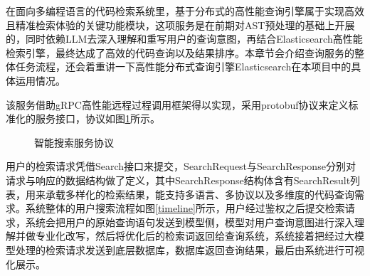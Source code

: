 \documentclass[UTF8,a4paper,12pt]{ctexart}
\numberwithin{equation}{section}
\begin{document}
在面向多编程语言的代码检索系统里，基于分布式的高性能查询引擎属于实现高效且精准检索体验的关键功能模块，这项服务是在前期对AST预处理的基础上开展的，同时依赖LLM去深入理解和重写用户的查询意图，再结合Elasticsearch高性能检索引擎，最终达成了高效的代码查询以及结果排序。本章节会介绍查询服务的整体任务流程，还会着重讲一下高性能分布式查询引擎Elasticsearch在本项目中的具体运用情况。\par
该服务借助gRPC高性能远程过程调用框架得以实现，采用protobuf协议来定义标准化的服务接口，协议如图\ref{search_proto}所示。\par
\begin{figure}[H]
	\caption{智能搜索服务协议}
	\label{search_proto}
\end{figure}
用户的检索请求凭借Search接口来提交，SearchRequest与SearchResponse分别对请求与响应的数据结构做了定义，其中SearchResponse结构体含有SearchResult列表，用来承载多样化的检索结果，能支持多语言、多协议以及多维度的代码查询需求。系统整体的用户搜索流程如图\ref{timeline}所示，用户经过鉴权之后提交检索请求，系统会把用户的原始查询语句发送到模型侧，模型对用户查询意图进行深入理解并做专业化改写，然后将优化后的检索词返回给查询系统，系统接着把经过大模型处理的检索请求发送到底层数据库，数据库返回查询结果，最后由系统进行可视化展示。\par
\end{document}
